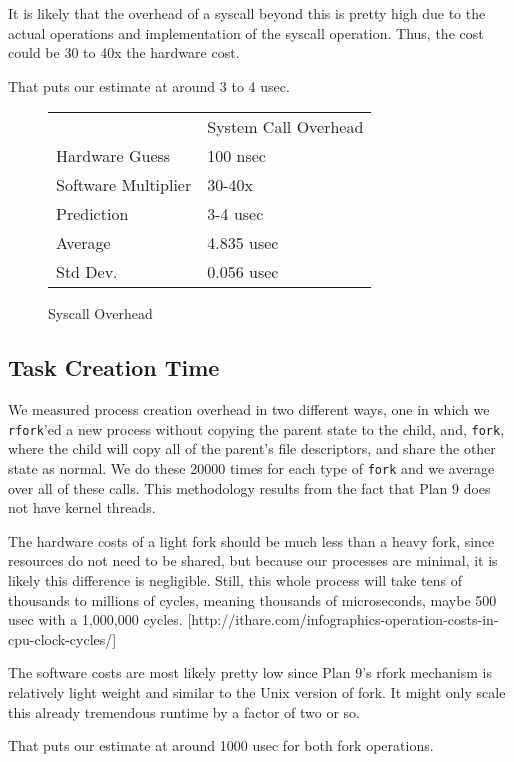 \documentclass[letterpaper,twocolumn,10pt]{article}
\begin{document}
It is likely that the overhead of a syscall beyond this is pretty high due to the
actual operations and implementation of the syscall operation. Thus, the cost could be 30 to
40x the hardware cost.

That puts our estimate at around 3 to 4 usec.

\begin{figure}
	\centering
    \begin{tabular}{ll}
            & System Call Overhead \\
    Hardware Guess  & 100 nsec  \\
    Software Multiplier  & 30-40x           \\
    Prediction  & 3-4 usec           \\
    Average  & 4.835 usec           \\
    Std Dev. & 0.056 usec          
    \end{tabular}
\caption{Syscall Overhead}
\label{tab:syscalloverheads}
\end{figure}

\subsection{Task Creation Time}

We measured process creation overhead in two different ways, one in which we
\texttt{rfork}'ed a new process without copying the parent state to the child,
and, \texttt{fork}, where the child will copy all of the parent's file
descriptors, and share the other state as normal. We do these 20000 times for
each type of \texttt{fork} and we average over all of these calls. This methodology
results from the fact that Plan 9 does not have kernel threads.

The hardware costs of a light fork should be much less than a heavy fork, since
resources do not need to be shared, but because our processes are minimal, it is
likely this difference is negligible. Still, this whole process will take tens of thousands to
millions of cycles, meaning thousands of microseconds, maybe 500 usec with a 1,000,000 cycles.
[http://ithare.com/infographics-operation-costs-in-cpu-clock-cycles/]

The software costs are most likely pretty low since Plan 9's rfork mechanism is relatively light
weight and similar to the Unix version of fork. It might only scale this already tremendous
runtime by a factor of two or so.

That puts our estimate at around 1000 usec for both fork operations.
\end{document}
